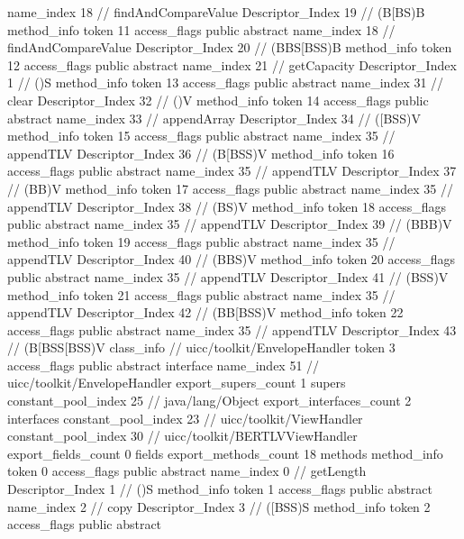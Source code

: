 {{{{{					name_index	18		// findAndCompareValue
					Descriptor_Index	19		// (B[BS)B
				}
				method_info {
					token	11
					access_flags	public abstract
					name_index	18		// findAndCompareValue
					Descriptor_Index	20		// (BBS[BSS)B
				}
				method_info {
					token	12
					access_flags	public abstract
					name_index	21		// getCapacity
					Descriptor_Index	1		// ()S
				}
				method_info {
					token	13
					access_flags	public abstract
					name_index	31		// clear
					Descriptor_Index	32		// ()V
				}
				method_info {
					token	14
					access_flags	public abstract
					name_index	33		// appendArray
					Descriptor_Index	34		// ([BSS)V
				}
				method_info {
					token	15
					access_flags	public abstract
					name_index	35		// appendTLV
					Descriptor_Index	36		// (B[BSS)V
				}
				method_info {
					token	16
					access_flags	public abstract
					name_index	35		// appendTLV
					Descriptor_Index	37		// (BB)V
				}
				method_info {
					token	17
					access_flags	public abstract
					name_index	35		// appendTLV
					Descriptor_Index	38		// (BS)V
				}
				method_info {
					token	18
					access_flags	public abstract
					name_index	35		// appendTLV
					Descriptor_Index	39		// (BBB)V
				}
				method_info {
					token	19
					access_flags	public abstract
					name_index	35		// appendTLV
					Descriptor_Index	40		// (BBS)V
				}
				method_info {
					token	20
					access_flags	public abstract
					name_index	35		// appendTLV
					Descriptor_Index	41		// (BSS)V
				}
				method_info {
					token	21
					access_flags	public abstract
					name_index	35		// appendTLV
					Descriptor_Index	42		// (BB[BSS)V
				}
				method_info {
					token	22
					access_flags	public abstract
					name_index	35		// appendTLV
					Descriptor_Index	43		// (B[BSS[BSS)V
				}
			}
		}
		class_info {		// uicc/toolkit/EnvelopeHandler
			token	3
			access_flags	public abstract interface
			name_index	51		// uicc/toolkit/EnvelopeHandler
			export_supers_count	1
			supers {
				constant_pool_index	25		// java/lang/Object
			}
			export_interfaces_count	2
			interfaces {
				constant_pool_index	23		// uicc/toolkit/ViewHandler
				constant_pool_index	30		// uicc/toolkit/BERTLVViewHandler
			}
			export_fields_count	0
			fields {
			}
			export_methods_count	18
			methods {
				method_info {
					token	0
					access_flags	public abstract
					name_index	0		// getLength
					Descriptor_Index	1		// ()S
				}
				method_info {
					token	1
					access_flags	public abstract
					name_index	2		// copy
					Descriptor_Index	3		// ([BSS)S
				}
				method_info {
					token	2
					access_flags	public abstract
}}}}}
